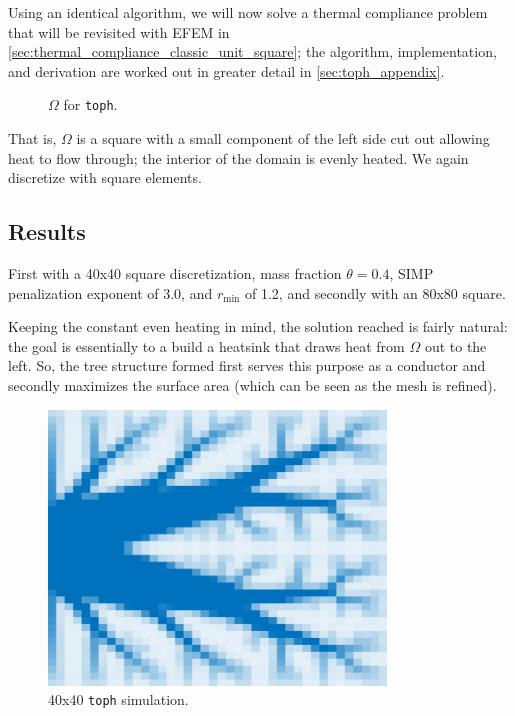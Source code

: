 Using an identical algorithm, we will now solve a thermal compliance problem
that will be revisited with EFEM in \autoref{sec:thermal_compliance_classic_unit_square};
the algorithm, implementation, and derivation are worked out in greater detail in \autoref{sec:toph_appendix}.

\begin{figure}[ht]
    \centering
    \caption[b]{$\Omega$ for \texttt{toph}.}
\end{figure}

That is, $\Omega$ is a square with a small component of the left side cut out allowing heat to flow through;
the interior of the domain is evenly heated. We again discretize with square elements.

\subsection{Results}

First with a 40x40 square discretization, mass fraction $\theta = 0.4$, SIMP penalization exponent of $3.0$,
and $r_\text{min}$ of 1.2, and secondly with an 80x80 square.

Keeping the constant even heating in mind, the solution reached is fairly natural: the goal
is essentially to a build a heatsink that draws heat from $\Omega$ out to the left. So, the
tree structure formed first serves this purpose as a conductor and secondly maximizes the surface area
(which can be seen as the mesh is refined).
\vfill\pagebreak

\begin{figure}[H]
    \centering
    \caption{40x40 \texttt{toph} simulation.}
    \includegraphics[width=0.8\textwidth]{imgs/TopH/toph_1.png}
\end{figure}

